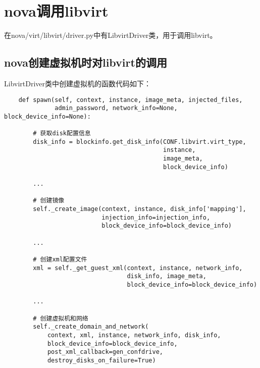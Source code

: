\documentclass[a4paper,left=1.5cm,right=1.5cm,11pt]{article}
\begin{document}
\tableofcontents

\clearpage

\section{nova调用libvirt}
	在nova/virt/libvirt/driver.py中有LibvirtDriver类，用于调用libvirt。

\subsection{nova创建虚拟机时对libvirt的调用}
	LibvirtDriver类中创建虚拟机的函数代码如下：
	\begin{lstlisting}
	def spawn(self, context, instance, image_meta, injected_files,
              admin_password, network_info=None, block_device_info=None):
		
		# 获取disk配置信息 
        disk_info = blockinfo.get_disk_info(CONF.libvirt.virt_type,
                                            instance,
                                            image_meta,
                                            block_device_info)

        ...

		# 创建镜像
        self._create_image(context, instance, disk_info['mapping'],
                           injection_info=injection_info,
                           block_device_info=block_device_info)

        ...

		# 创建xml配置文件
        xml = self._get_guest_xml(context, instance, network_info,
                                  disk_info, image_meta,
                                  block_device_info=block_device_info)

		...

		# 创建虚拟机和网络
        self._create_domain_and_network(
            context, xml, instance, network_info, disk_info,
            block_device_info=block_device_info,
            post_xml_callback=gen_confdrive,
            destroy_disks_on_failure=True)
	\end{lstlisting}

\clearpage
\end{document}
